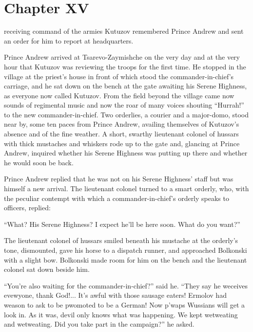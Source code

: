 \chapter*{Chapter XV} \ifaudio {}
\fi

 receiving command of the armies Kutuzov remembered Prince
Andrew and sent an order for him to report at headquarters.

Prince Andrew arrived at Tsarevo-Zaymishche on the very day and
at the very hour that Kutuzov was reviewing the troops for the
first time. He stopped in the village at the priest's house in
front of which stood the commander-in-chief's carriage, and he
sat down on the bench at the gate awaiting his Serene Highness,
as everyone now called Kutuzov. From the field beyond the village
came now sounds of regimental music and now the roar of many
voices shouting ``Hurrah!'' to the new commander-in-chief.  Two
orderlies, a courier and a major-domo, stood near by, some ten
paces from Prince Andrew, availing themselves of Kutuzov's
absence and of the fine weather. A short, swarthy lieutenant
colonel of hussars with thick mustaches and whiskers rode up to
the gate and, glancing at Prince Andrew, inquired whether his
Serene Highness was putting up there and whether he would soon be
back.

Prince Andrew replied that he was not on his Serene Highness'
staff but was himself a new arrival. The lieutenant colonel
turned to a smart orderly, who, with the peculiar contempt with
which a commander-in-chief's orderly speaks to officers, replied:

``What? His Serene Highness? I expect he'll be here soon. What do
you want?''

The lieutenant colonel of hussars smiled beneath his mustache at
the orderly's tone, dismounted, gave his horse to a dispatch
runner, and approached Bolkonski with a slight bow. Bolkonski
made room for him on the bench and the lieutenant colonel sat
down beside him.

``You're also waiting for the commander-in-chief?'' said
he. ``They say he weceives evewyone, thank God!... It's awful
with those sausage eaters!  Ermolov had weason to ask to be
pwomoted to be a German! Now p'waps Wussians will get a look
in. As it was, devil only knows what was happening. We kept
wetweating and wetweating. Did you take part in the campaign?''
he asked.

